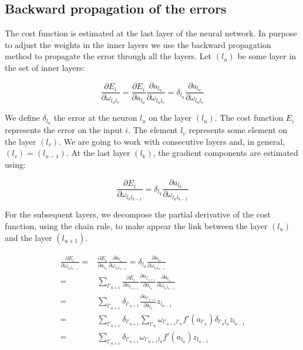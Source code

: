 \documentclass[final, paper=letter,5p,times,twocolumn]{elsarticle}
\begin{document}
\subsection{Backward propagation of the errors}

The cost function is estimated at the last layer of the neural network. In purpose to adjust the weights in the inner layers we use the backward propagation method to propagate the error through all the layers. Let $(l_{u})$ be some layer in the set of inner layers:

\begin{equation*}
  \frac{\partial E_{i}}{\partial \omega_{l_{u}l_{v}}} = \frac{\partial E_{i}}{\partial a_{l_{u}}} \frac{\partial a_{l_{u}}}{\partial \omega_{l_{u}l_{v}}} = \delta_{l_{u}}\frac{\partial a_{l_{u}}}{\partial \omega_{l_{u}l_{v}}} 
\end{equation*}

We define $\delta_{l_{u}}$ the error at the neuron $l_{u}$ on the layer $(l_{u})$. The cost function $E_{i}$ represents the error on the input $i$. The element $l_{v}$ represents some element on the layer $(l_{v})$. We are going to work with consecutive layers and, in general, $(l_{v}) = (l_{u-1})$. At the last layer $(l_{k})$, the gradient components are estimated using:

\begin{equation}
  \frac{\partial E_{i}}{\partial \omega_{l_{k}l_{k-1}}} = \delta_{l_{k}}\frac{\partial a_{l_{k}}}{\partial \omega_{l_{k}l_{k-1}}} 
\label{eq:backprob_layer_k}
\end{equation}

For the subsequent layers, we decompose the partial derivative of the cost function, using the chain rule, to make appear the link between the layer $(l_{u})$ and the layer $(l_{u+1})$. 

\begin{equation}
  \begin{split}
    \frac{\partial E_{i}}{\partial \omega_{l_{u}l_{u-1}}} = &  \frac{\partial E_{i}}{\partial a_{l_{u}}} \frac{\partial a_{l_{u}}}{\partial \omega_{l_{u}l_{u-1}}} = \delta_{l_{u}} \frac{\partial a_{l_{u}}}{\partial \omega_{l_{u}l_{u-1}}}  \\
    = & \sum_{l'_{u+1}}\frac{\partial E_{i}}{\partial a_{l'_{u+1}}} \frac{\partial a_{l'_{u+1}}}{\partial a_{l_{u}}} \frac{\partial a_{l_{u}}}{\partial \omega_{l_{u}l_{u-1}}}   \\
    = & \sum_{l'_{u+1}} \delta_{l'_{u+1}} \frac{\partial a_{l'_{u+1}}}{\partial a_{l_{u}}} z_{l_{u-1}}   \\
    = & \sum_{l'_{u+1}} \delta_{l'_{u+1}} \sum_{l'_{u}} \omega_{l'_{u+1}l'_{u}} f'(a_{l'_{u}}) \delta_{l'_{u}l_{u}} z_{l_{u-1}}   \\
    = & \sum_{l'_{u+1}} \delta_{l'_{u+1}} \omega_{l'_{u+1}l_{u}} f'(a_{l_{u}}) z_{l_{u-1}}   \\
  \end{split}
\label{eq:backprob}
\end{equation}
\end{document}
